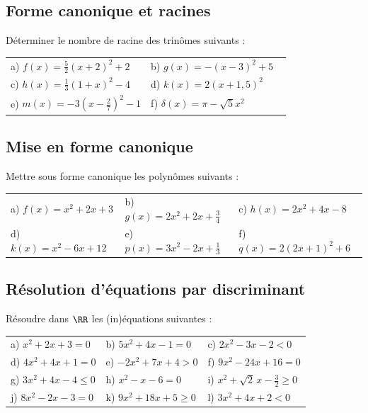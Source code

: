 \documentclass[oneside,12pt]{book}          %
\begin{document}
\subsection{Forme canonique et racines}
 Déterminer le nombre de racine des trinômes suivants :

\renewcommand{\arraystretch}{1.5}
\begin{tabular}{p{0.5\linewidth} p{0.5\linewidth}}
    a) $f(x) = \frac{5}{2}(x+2)^{2} +2 $ &
    b) $g(x) = -(x-3)^{2} +5 $ \\
    c) $h(x) = \frac{1}{3}(1+x)^{2} -4 $ &
    d) $k(x) = 2(x+1,5)^{2} $ \\
    e) $m(x) = -3(x-\frac{2}{7})^{2} -1 $ &
    f) $\delta(x) = \pi - \sqrt{5}x^2$
\end{tabular}


    
\subsection{Mise en forme canonique}
Mettre sous forme canonique les polynômes suivants :

\begin{tabular}{p{} p{} p{} }
    a) $f(x)=x^{2} + 2x + 3 $ &  b) $g(x)=2x^{2} + 2x + \frac{3}{4} $ & c) $h(x)=2x^{2} + 4x -8$ \\
    d) $k(x)=x^{2} -6x +12 $ & e) $p(x)=3x^{2} - 2x + \frac{1}{3}$ &  f) $q(x)=2(2x+1)^{2}+6$ \\     
\end{tabular}



\subsection{Résolution d'équations par discriminant}
Résoudre dans $\RR$ les (in)équations suivantes :

\begin{tabular}{p{} p{} p{} }
    a) $x^{2} + 2x + 3 = 0$ &  b) $5x^{2} + 4x - 1 = 0$ & c) $2x^{2} - 3x -2 < 0$ \\
    d) $4x^{2} +4x +1 = 0 $ & e) $-2x^{2} + 7x + 4 > 0$ &  f) $9x^{2} - 24x + 16 = 0$ \\   
    g) $3x^{2} + 4x - 4 \leq 0$ &  h) $x^{2} - x -6 = 0$ & i) $x^{2} + \sqrt{2}\,x - \frac{3}{2} \geq 0$ \\
    j) $8x^2-2x-3=0$ & k) $9x^2+18x+5\geq0$ & l) $3x^2+4x+2<0$    
\end{tabular}
\end{document}

